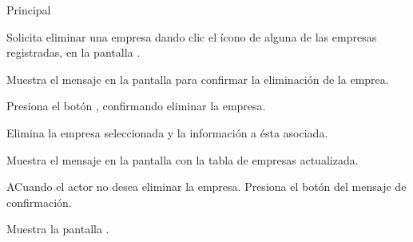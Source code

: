 \begin{UCtrayectoria}{Principal}

	\UCpaso [\UCactor] Solicita eliminar una empresa dando clic el ícono  de alguna de las empresas registradas, en la pantalla . 

	\UCpaso Muestra el mensaje  en la pantalla  para confirmar la eliminación de la emprea. 

	\UCpaso [\UCactor] Presiona el botón , confirmando eliminar la empresa.  

	\UCpaso Elimina la empresa seleccionada y la información a ésta asociada. 

	\UCpaso Muestra el mensaje  en la pantalla  con la tabla de empresas actualizada. 

\end{UCtrayectoria}

\begin{UCtrayectoriaA}{A}{Cuando el actor no desea eliminar la empresa.}
	\UCpaso [\UCactor] Presiona el botón  del mensaje de confirmación.

	\UCpaso Muestra la pantalla . 
\end{UCtrayectoriaA}


